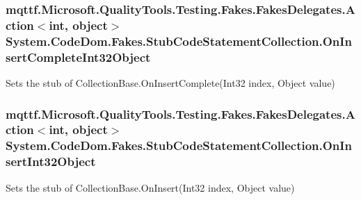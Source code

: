 \hypertarget{class_system_1_1_code_dom_1_1_fakes_1_1_stub_code_statement_collection_ad07720f458903bfe74953dc2acd31342}{
\subsubsection[{On\-Insert\-Complete\-Int32\-Object}]{\setlength{\rightskip}{0pt plus 5cm}mqttf.\-Microsoft.\-Quality\-Tools.\-Testing.\-Fakes.\-Fakes\-Delegates.\-Action$<$int, object$>$ System.\-Code\-Dom.\-Fakes.\-Stub\-Code\-Statement\-Collection.\-On\-Insert\-Complete\-Int32\-Object}}\label{class_system_1_1_code_dom_1_1_fakes_1_1_stub_code_statement_collection_ad07720f458903bfe74953dc2acd31342}


Sets the stub of Collection\-Base.\-On\-Insert\-Complete(\-Int32 index, Object value)

\hypertarget{class_system_1_1_code_dom_1_1_fakes_1_1_stub_code_statement_collection_ad9548e4f0b47aaa3710db119eb685d7e}{
\subsubsection[{On\-Insert\-Int32\-Object}]{\setlength{\rightskip}{0pt plus 5cm}mqttf.\-Microsoft.\-Quality\-Tools.\-Testing.\-Fakes.\-Fakes\-Delegates.\-Action$<$int, object$>$ System.\-Code\-Dom.\-Fakes.\-Stub\-Code\-Statement\-Collection.\-On\-Insert\-Int32\-Object}}\label{class_system_1_1_code_dom_1_1_fakes_1_1_stub_code_statement_collection_ad9548e4f0b47aaa3710db119eb685d7e}


Sets the stub of Collection\-Base.\-On\-Insert(\-Int32 index, Object value)

